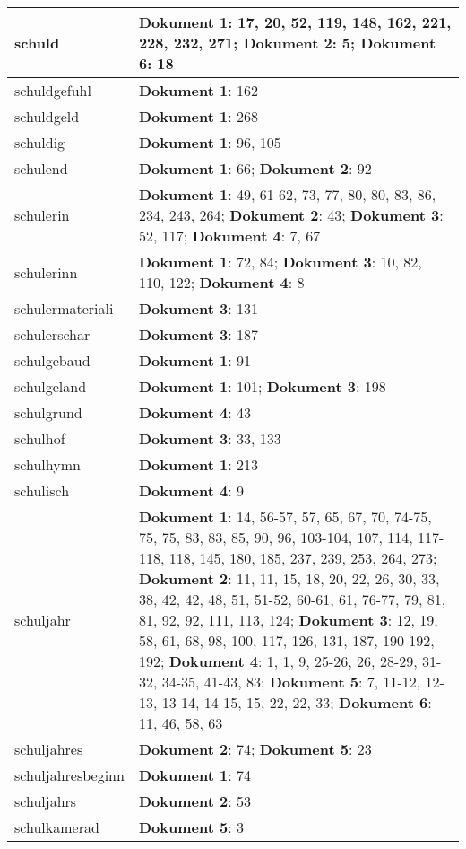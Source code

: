 \documentclass[a5paper]{article}
\begin{document}
\begin{longtable}[l]{|l|p{3in}|}
schuld & \textbf{Dokument 1}: 17, 20, 52, 119, 148, 162, 221, 228, 232, 271; \textbf{Dokument 2}: 5; \textbf{Dokument 6}: 18 \\
\hline
schuldgefuhl & \textbf{Dokument 1}: 162 \\
\hline
schuldgeld & \textbf{Dokument 1}: 268 \\
\hline
schuldig & \textbf{Dokument 1}: 96, 105 \\
\hline
schulend & \textbf{Dokument 1}: 66; \textbf{Dokument 2}: 92 \\
\hline
schulerin & \textbf{Dokument 1}: 49, 61-62, 73, 77, 80, 80, 83, 86, 234, 243, 264; \textbf{Dokument 2}: 43; \textbf{Dokument 3}: 52, 117; \textbf{Dokument 4}: 7, 67 \\
\hline
schulerinn & \textbf{Dokument 1}: 72, 84; \textbf{Dokument 3}: 10, 82, 110, 122; \textbf{Dokument 4}: 8 \\
\hline
schulermateriali & \textbf{Dokument 3}: 131 \\
\hline
schulerschar & \textbf{Dokument 3}: 187 \\
\hline
schulgebaud & \textbf{Dokument 1}: 91 \\
\hline
schulgeland & \textbf{Dokument 1}: 101; \textbf{Dokument 3}: 198 \\
\hline
schulgrund & \textbf{Dokument 4}: 43 \\
\hline
schulhof & \textbf{Dokument 3}: 33, 133 \\
\hline
schulhymn & \textbf{Dokument 1}: 213 \\
\hline
schulisch & \textbf{Dokument 4}: 9 \\
\hline
schuljahr & \textbf{Dokument 1}: 14, 56-57, 57, 65, 67, 70, 74-75, 75, 75, 83, 83, 85, 90, 96, 103-104, 107, 114, 117-118, 118, 145, 180, 185, 237, 239, 253, 264, 273; \textbf{Dokument 2}: 11, 11, 15, 18, 20, 22, 26, 30, 33, 38, 42, 42, 48, 51, 51-52, 60-61, 61, 76-77, 79, 81, 81, 92, 92, 111, 113, 124; \textbf{Dokument 3}: 12, 19, 58, 61, 68, 98, 100, 117, 126, 131, 187, 190-192, 192; \textbf{Dokument 4}: 1, 1, 9, 25-26, 26, 28-29, 31-32, 34-35, 41-43, 83; \textbf{Dokument 5}: 7, 11-12, 12-13, 13-14, 14-15, 15, 22, 22, 33; \textbf{Dokument 6}: 11, 46, 58, 63 \\
\hline
schuljahres & \textbf{Dokument 2}: 74; \textbf{Dokument 5}: 23 \\
\hline
schuljahresbeginn & \textbf{Dokument 1}: 74 \\
\hline
schuljahrs & \textbf{Dokument 2}: 53 \\
\hline
schulkamerad & \textbf{Dokument 5}: 3 \\

\end{longtable}
\end{document}
